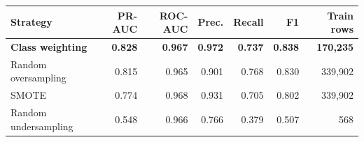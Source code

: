 \begin{tabular}{l r r r r r r}
\hline
\textbf{Strategy} & \textbf{PR-AUC} & \textbf{ROC-AUC} & \textbf{Prec.} & \textbf{Recall} & \textbf{F1} & \textbf{Train rows} \\
\hline
\textbf{Class weighting} & \textbf{0.828} & \textbf{0.967} & \textbf{0.972} & \textbf{0.737} & \textbf{0.838} & \textbf{170{,}235} \\
Random oversampling & 0.815 & 0.965 & 0.901 & 0.768 & 0.830 & 339{,}902 \\
SMOTE & 0.774 & 0.968 & 0.931 & 0.705 & 0.802 & 339{,}902 \\
Random undersampling & 0.548 & 0.966 & 0.766 & 0.379 & 0.507 & 568 \\
\hline
\end{tabular}